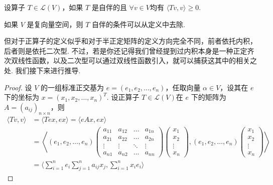 \begin{definition}
    设算子 $ T \in \mathcal{L}(V) $，如果 $ T $ 是自伴的且 $ \forall v \in V $均有 $ \langle Tv, v \rangle \geqslant 0 $.
\end{definition}

如果 $ V $ 是复向量空间，则 $ T $ 自伴的条件可以从定义中去除.

但对于正算子的定义似乎和对于半正定矩阵的定义方向完全不同，前者依托内积，后者则是依托二次型. 不过，若是你还记得我们曾经提到过内积本身是一种正定齐次双线性函数，以及二次型可以通过双线性函数引入，就可以捕获这其中的相关之处. 我们接下来进行推导.

\begin{proof}
    设 $ V $ 的一组标准正交基为 $ e = (e_1, e_2, \ldots, e_n) $，任取向量 $ \alpha \in V $，设其在 $ e $ 下的坐标为 $ x = (x_1, x_2, \ldots, x_n)^{T} $. 设正算子 $ T \in \mathcal{L}(V) $在 $ e $ 下的矩阵为 $ A = (a_{ij})_{n \times n}$，则
    \begin{align*}
        \langle Tv, v \rangle
         & = \langle Tex, ex \rangle = \langle eAx, ex \rangle                                                                                       \\
         & = \left\langle (e_1, e_2, \ldots ,e_n)
        \begin{pmatrix}
            a_{11} & a_{12} & \ldots & a_{1n} \\
            a_{21} & a_{22} & \ldots & a_{2n} \\
            \vdots & \vdots & \ddots & \vdots \\
            a_{n1} & a_{n2} & \ldots & a_{nn}
        \end{pmatrix}
        \begin{pmatrix}
            x_1    \\
            x_2    \\
            \vdots \\
            x_n
        \end{pmatrix} ,(e_1, e_2, \ldots ,e_n)
        \begin{pmatrix}
            x_1    \\
            x_2    \\
            \vdots \\
            x_n
        \end{pmatrix} \right\rangle                                                                                                                  \\
         & = \langle \sum_{i = 1}^{n}e_{i}\sum_{j = 1}^{n}a_{ij}x_{j}, \sum_{i = 1}^{n}x_{i}e_{i} \rangle

\end{align*}
\end{proof}
